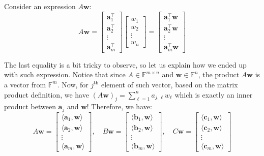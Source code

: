 \documentclass[../lecture-notes-148x210.tex]{subfiles}
\begin{document}
Consider an expression $A\mathbf{w}$:
\begin{equation*}
    A\mathbf{w} = \begin{bmatrix}
        \mathbf{a}_1^{\top} \\ \mathbf{a}_2^{\top} \\ \vdots \\ \mathbf{a}_m^{\top}
    \end{bmatrix}\begin{bmatrix}
        w_1 \\ w_2 \\ \vdots \\ w_n
    \end{bmatrix} = \begin{bmatrix}
        \mathbf{a}_1^{\top}\mathbf{w} \\ \mathbf{a}_2^{\top}\mathbf{w} \\ \vdots \\ \mathbf{a}_m^{\top}\mathbf{w}
    \end{bmatrix}
\end{equation*}

The last equality is a bit tricky to observe, so let us explain how we ended up with such expression. Notice that since $A \in \mathbb{F}^{m \times n}$ and $\mathbf{w} \in \mathbb{F}^n$, the product $A\mathbf{w}$ is a vector from $\mathbb{F}^m$. Now, for $j^{\text{th}}$ element of such vector, based on the matrix product definition, we have $(A\mathbf{w})_j = \sum_{\ell=1}^na_{j,\ell}w_{\ell}$ which is exactly an inner product between $\mathbf{a}_j$ and $\mathbf{w}$! Therefore, we have:
\begin{equation*}
    A\mathbf{w} = \begin{bmatrix}
        \langle \mathbf{a}_1, \mathbf{w}\rangle \\
        \langle \mathbf{a}_2, \mathbf{w}\rangle \\
        \vdots \\
        \langle \mathbf{a}_m, \mathbf{w}\rangle 
    \end{bmatrix}, \quad
    B\mathbf{w} = \begin{bmatrix}
        \langle \mathbf{b}_1, \mathbf{w}\rangle \\
        \langle \mathbf{b}_2, \mathbf{w}\rangle \\
        \vdots \\
        \langle \mathbf{b}_m, \mathbf{w}\rangle 
    \end{bmatrix}, \quad
    C\mathbf{w} = \begin{bmatrix}
        \langle \mathbf{c}_1, \mathbf{w}\rangle \\
        \langle \mathbf{c}_2, \mathbf{w}\rangle \\
        \vdots \\
        \langle \mathbf{c}_m, \mathbf{w}\rangle 
    \end{bmatrix}
\end{equation*}
\end{document}

